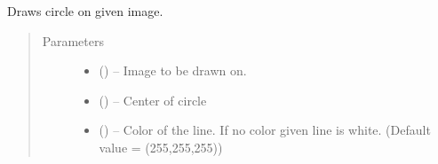 \documentclass[letterpaper,10pt,english]{sphinxmanual}
\begin{document}
\begin{fulllineitems}
\label{\detokenize{image_helpers:image_helpers.draw_circle}}
Draws circle on given image.
\begin{quote}\begin{description}
\item[{Parameters}] \leavevmode\begin{itemize}
\item {} 
 () -- Image to be drawn on.

\item {} 
 () -- Center of circle

\item {} 
 () -- Color of the line. If no color given line is white.
(Default value = (255,255,255))

\end{itemize}

\end{description}\end{quote}

\end{fulllineitems}

\end{document}
